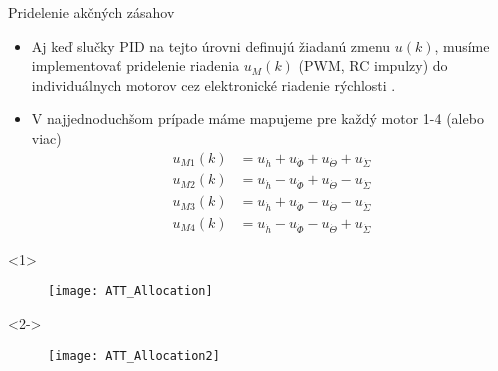   \begin{frame}{Pridelenie akčných zásahov}
  \begin{itemize}
    \item<1-> Aj keď slučky PID na tejto úrovni definujú žiadanú zmenu $u(k)$, musíme implementovať pridelenie riadenia  $u_M(k)$ (PWM, RC impulzy) do individuálnych motorov cez elektronické riadenie rýchlosti .
     \item<2-> V najjednoduchšom prípade máme mapujeme pre každý motor 1-4 (alebo viac)
    \begin{align}
     u_{M1}(k) &= u_{\dot{h}}  + u_{\dot{\Phi}} + u_{\dot{\Theta}}  + u_{\dot{\Sigma}}\\
     u_{M2}(k) &= u_{\dot{h}}  - u_{\dot{\Phi}} + u_{\dot{\Theta}}  - u_{\dot{\Sigma}}\\
     u_{M3}(k) &= u_{\dot{h}}  + u_{\dot{\Phi}} - u_{\dot{\Theta}}  - u_{\dot{\Sigma}}\\
     u_{M4}(k) &= u_{\dot{h}}  - u_{\dot{\Phi}} - u_{\dot{\Theta}}  + u_{\dot{\Sigma}}
     \end{align}
\end{itemize}
    \begin{onlyenv}<1>
  \begin{figure}
\centering
  \texttt{[image: ATT\_Allocation]}\\
\end{figure}
\end{onlyenv}
    \begin{onlyenv}<2->
  \begin{figure}
\centering
  \texttt{[image: ATT\_Allocation2]}\\
\end{figure}
\end{onlyenv}
  \end{frame}


